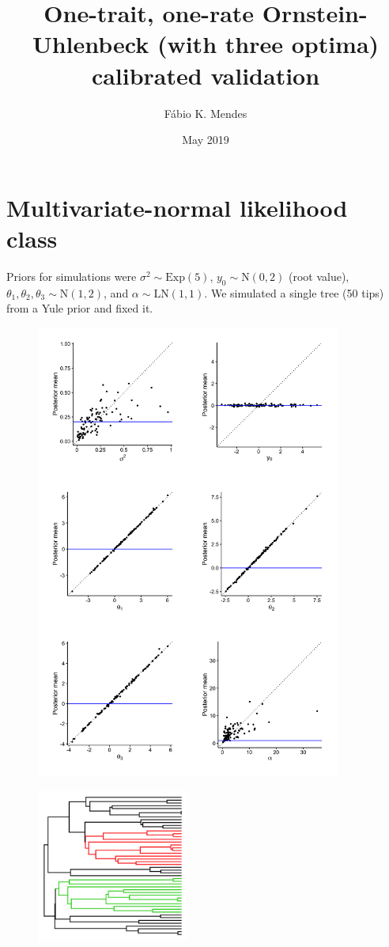 \documentclass{article}
\title{One-trait, one-rate Ornstein-Uhlenbeck (with three optima) calibrated validation}
\author{F\'{a}bio K. Mendes}
\date{May 2019}
\begin{document}
\maketitle

\newpage

\section{Multivariate-normal likelihood class}

Priors for simulations were $\sigma^2 \sim \text{Exp}(5)$, $y_0 \sim
\text{N}(0, 2)$ (root value), $\theta_1, \theta_2, \theta_3 \sim \text{N}(1, 2)$, and $\alpha \sim
\text{LN}(1, 1)$.
We simulated a single tree (50 tips) from a Yule prior and fixed it.

\begin{figure}[h]
  \centering
  \includegraphics[width=10cm]{../OUMVNThreeOpt_ultra_graphs.png}
\end{figure}

\begin{figure}[h]
  \centering
  \includegraphics[width=5cm]{../OUMVNThreeOpt_ultra_tree.png}
\end{figure}
\end{document}
